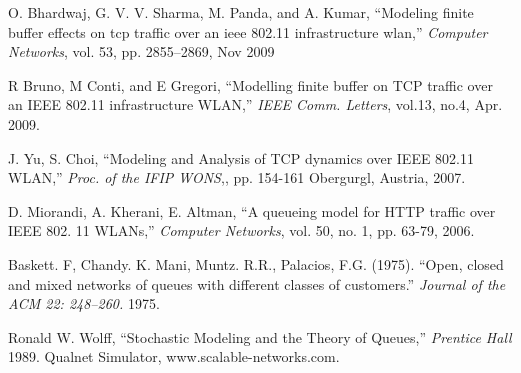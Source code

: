 \documentclass[conference]{IEEEtran}
\begin{document}
\begin{thebibliography}{}
O. Bhardwaj, G. V. V. Sharma, M. Panda, and A. Kumar, ``Modeling finite buffer
effects on tcp traffic over an ieee 802.11 infrastructure wlan,'' 
\emph{ Computer Networks}, vol. 53, pp. 2855–2869, Nov 2009

R Bruno, M Conti, and E Gregori, ``Modelling finite buffer on TCP traffic 
over an IEEE 802.11 infrastructure WLAN,'' \emph{IEEE Comm. Letters}, vol.13, no.4,
 Apr. 2009.

J. Yu, S. Choi, ``Modeling and Analysis of TCP dynamics over
IEEE 802.11 WLAN,'' \emph{Proc. of the IFIP WONS},, pp. 154-161
Obergurgl, Austria, 2007.

D. Miorandi, A. Kherani, E. Altman, ``A queueing model for
HTTP traffic over IEEE 802. 11 WLANs,'' \emph{Computer Networks}, vol. 50, 
no. 1, pp. 63-79, 2006.


Baskett. F, Chandy. K. Mani, Muntz. R.R., Palacios, F.G. (1975). ``Open, closed and mixed networks of queues with different classes of customers.''
\emph{ Journal of the ACM 22: 248–260.} 1975.

 Ronald W. Wolff,  ``Stochastic Modeling and the Theory of Queues,''
 \emph{ Prentice Hall} 1989.
Qualnet Simulator, www.scalable-networks.com.
\end{thebibliography}
\ifCLASSOPTIONcaptionsoff
  \newpage
\fi
\end{document}
